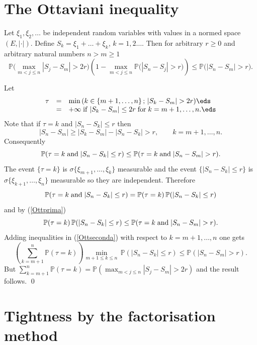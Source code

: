 \documentclass[preprint]{imsart}
\def\P{\mathbb P}
\def\ds{\displaystyle}
\begin{document}
{\section{The Ottaviani inequality} \label{Ottaviani}

\begin{Theorem}
Let $\xi_1,\xi_2,\ldots$ be independent random
variables with values in a normed space $(E,|\cdot |)$.
Define $S_k=\xi_1+\ldots+\xi_k$, $k=1,2\ldots$. Then
for arbitrary $r\geq 0$ and arbitrary natural numbers
$n>m\geq 1$
$$
\P\bigg( \max_{m<j\leq n}|S_j-S_m|>2r\bigg)
\left( 1-\max_{m<j\leq n}\P\bigg(|S_n-S_j|>r\bigg)\right)
\leq\P\bigg(  |S_n-S_m|>r\bigg).
$$
\end{Theorem}

 Let
$$
  \begin{array}{lll}
    \tau &= & \ds
    \min\, (k\in\{m+1,\ldots,n\}\, ;\,
    |S_k-S_m|>2r)
    \eds \\
    &= & \ds
    +\infty {\rm \; if\;} |S_k-S_m|\leq 2r {\rm \;
    for\;} k=m+1,\ldots,n.
    \eds
  \end{array}
$$
Note that if $\tau=k$ and $|S_n-S_k|\leq r$ then
$$
|S_n-S_m|\geq |S_k-S_m| -|S_n-S_k|>r,
\qquad k=m+1,\ldots,n.
$$
Consequently
\begin{equation}\label{Ottprima}
\P ( \tau=k {\rm \; and\;} |S_n-S_k|\leq r )\leq
\P ( \tau=k {\rm \; and\;} |S_n-S_m|> r ).
\end{equation}
The event $\{\tau=k\}$ is $\sigma\{\xi_{m+1},\ldots
,\xi_k\}$ measurable and the event $\{|S_n-S_k|\leq r
\}$
 is $\sigma\{\xi_{k+1},\ldots
,\xi_n\}$ measurable so they are independent. Therefore
$$
\P ( \tau=k {\rm \; and\;} |S_n-S_k|\leq r )
= \P ( \tau=k)\,\P (  |S_n-S_k|\leq r )
$$
and by (\ref{Ottprima})
\begin{equation}\label{Ottseconda}
\P ( \tau=k)\,\P (  |S_n-S_k|\leq r )\leq
\P ( \tau=k {\rm \; and\;} |S_n-S_m|>r ).
\end{equation}
Adding inequalities in (\ref{Ottseconda}) with respect
to $k=m+1,\ldots,n$ one gets
$$
\left( \sum_{k=m+1}^n\P (\tau=k)\right)
\min_{m+1\leq k\leq n}\,\P (  |S_n-S_k|\leq r )
\leq
\P (|S_n-S_m|>r ).
$$
But $\sum_{k=m+1}^n\P (\tau=k) =
\P ( \max_{m<j\leq n}|S_j-S_m|>2r )$ and the result follows.
\qed


\section{Tightness by the factorisation method}

}
\end{document}
